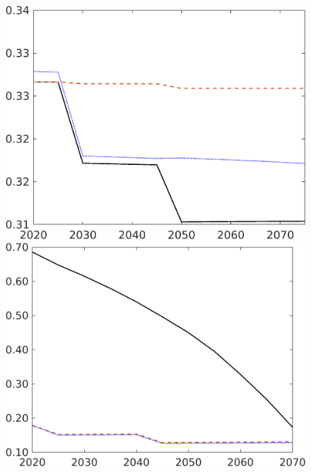\begin{figure}[h!!]
\begin{minipage}[]{0.32\textwidth}
	\end{minipage}
	\begin{minipage}[]{0.32\textwidth}
		\includegraphics[width=1\textwidth]{../../codding_model/own_basedOnFried/optimalPol_190722_tidiedUp/figures/all_July22/hl_DDCompEffOPT_T_NoTaus_pol3_spillover0_noskill0_sep1_xgrowth0_etaa0.79_lgd0_lff0.png}
	\end{minipage}
	\begin{minipage}[]{0.32\textwidth}
		\includegraphics[width=1\textwidth]{../../codding_model/own_basedOnFried/optimalPol_190722_tidiedUp/figures/all_July22/gAagg_DDCompEffOPT_T_NoTaus_pol3_spillover0_noskill0_sep1_xgrowth0_etaa0.79_lgd0_lff0.png}

\end{minipage}
\end{figure}
